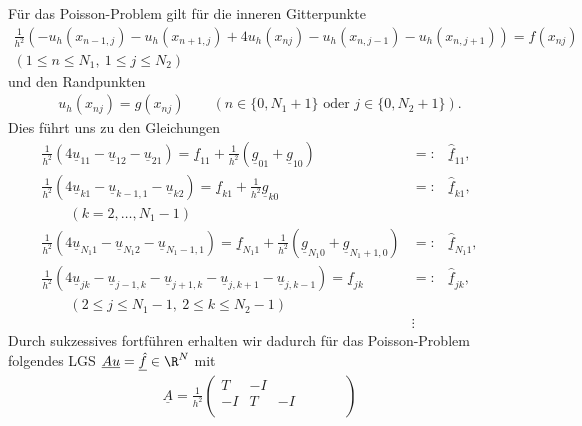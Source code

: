 \begin{Beispiel}
    Für das Poisson-Problem gilt für die inneren Gitterpunkte
    \begin{eqnarray*}
        \frac{1}{h^2} (- u_h(x_{n-1, j}) - u_h(x_{n+1, j}) + 4 u_h(x_{n j})
        - u_h(x_{n, j-1}) - u_h(x_{n, j+1})) = f(x_{n j}) \\
        (1 \le n \le N_1, \ 1 \le j \le N_2)
    \end{eqnarray*} 
    und den Randpunkten
    \begin{eqnarray*}
        u_h(x_{n j}) = g(x_{n j})
        \qquad (n\in \{0, N_1 + 1\} \text{ oder } j\in \{0, N_2 + 1\}).
    \end{eqnarray*}
    Dies führt uns zu den Gleichungen
    \begin{eqnarray*}
          \frac{1}{h^2} (4 \underline u_{1 1} - \underline u_{1 2}
          - \underline u_{2 1})
        = \underline f_{1 1} + \frac{1}{h^2} (\underline g_{0 1}
          + \underline g_{1 0})
        &= \colon& \underline{\hat{f}}_{1 1}, \\
          \frac{1}{h^2} (4 \underline u_{k 1} - \underline u_{k-1,1}
          - \underline u_{k 2})
        = \underline f_{k 1} + \frac{1}{h^2} \underline g_{k 0}
        &= \colon& \underline{\hat{f}}_{k 1}, \\
          \qquad (k = 2, \dots, N_1 - 1) \\
          \frac{1}{h^2} (4 \underline u_{N_1 1} - \underline u_{N_1 2}
          - \underline u_{N_1-1,1})
        = \underline f_{N_1 1} + \frac{1}{h^2} (\underline g_{N_1 0}
          + \underline g_{N_1+1,0})
        &= \colon& \underline{\hat{f}}_{N_1 1}, \\
          \frac{1}{h^2} (4 \underline u_{j k} - \underline u_{j-1,k}
          - \underline u_{j+1,k} - \underline u_{j,k+1} - \underline u_{j,k-1})
        = \underline f_{j k}
        &= \colon& \underline{\hat{f}}_{j k}, \\
          \qquad (2 \le j \le N_1 - 1, \ 2 \le k \le N_2 - 1) \\
        &\vdots&
    \end{eqnarray*}
    Durch sukzessives fortführen erhalten wir dadurch für das Poisson-Problem
    folgendes LGS
    $\underline A \underline u = \underline{\hat{f}} \in \R^N$ mit
    \begin{eqnarray*}
        \underline A = \frac{1}{h^2}
                       \begin{pmatrix}
                          T & -I & & & & & \\
                          -I & T & -I & & & & \\

\end{pmatrix}
\end{eqnarray*}
\end{Beispiel}
